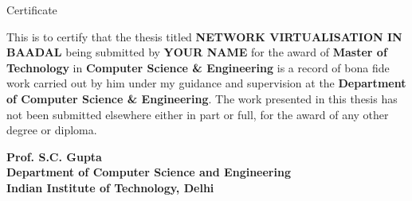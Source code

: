 \begin{center}
\LARGE{ Certificate} 
\end{center}

\vspace{0.5in}

This is to certify that the thesis titled {\bfseries NETWORK VIRTUALISATION IN BAADAL} being submitted by
{\bfseries YOUR NAME} for the award of {\bfseries Master of Technology} in {\bfseries Computer Science \& Engineering} is a record of bona fide work carried out by him under my guidance and supervision at the {\bfseries Department of Computer Science \& Engineering}. The work presented in this thesis has not been submitted elsewhere either in part or full, for the award of any other degree or diploma.

\vspace{1.5in}


{\bfseries Prof. S.C. Gupta} \\
{\bfseries Department of Computer Science and Engineering} \\
{\bfseries Indian Institute of Technology, Delhi}\\ 
